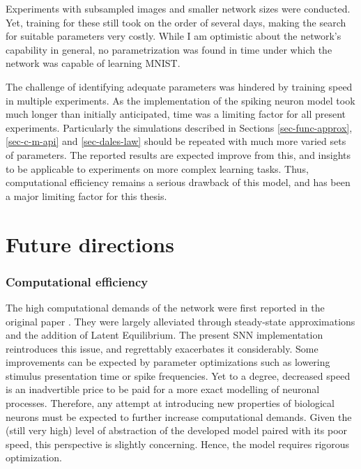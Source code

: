 Experiments with subsampled images and smaller network sizes were conducted. Yet, training for these still took on the
order of several days, making the search for suitable parameters very costly. While I am optimistic about the network's
capability in general, no parametrization was found in time under which the network was capable of learning MNIST. 


The challenge of identifying adequate parameters was hindered by training speed in multiple experiments. As the
implementation of the spiking neuron model took much longer than initially anticipated, time was a limiting factor for
all present experiments. Particularly the simulations described in Sections \ref{sec-func-approx}, \ref{sec-c-m-api} and
\ref{sec-dales-law} should be repeated with much more varied sets of parameters. The reported results are expected
improve from this, and insights to be applicable to experiments on more complex learning tasks. Thus, computational
efficiency remains a serious drawback of this model, and has been a major limiting factor for this thesis.


\section{Future directions}

\subsubsection*{Computational efficiency}

The high computational demands of the network were first reported in the original paper \citep{sacramento2018dendritic}. They were largely alleviated
through steady-state approximations and the addition of Latent Equilibrium. The present SNN implementation reintroduces
this issue, and regrettably exacerbates it considerably. Some improvements can be expected by parameter optimizations
such as lowering stimulus presentation time or spike frequencies. Yet to a degree, decreased speed is an inadvertible
price to be paid for a more exact modelling of neuronal processes. Therefore, any attempt at introducing new properties
of biological neurons must be expected to further increase computational demands. Given the (still very high) level of
abstraction of the developed model paired with its poor speed, this perspective is slightly concerning. Hence, the
model requires rigorous optimization.

